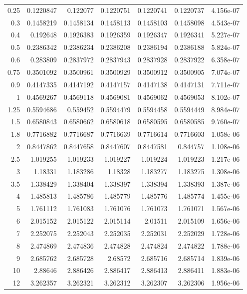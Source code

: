 \begin{longtable}{@{}rrrrrrr@{}}
0.25 & 0.1220847 & 0.122077 & 0.1220751 & 0.1220741 & 0.1220737 & 4.156e-07\\
0.3 & 0.1458219 & 0.1458134 & 0.1458113 & 0.1458103 & 0.1458098 & 4.543e-07\\
0.4 & 0.192648 & 0.1926383 & 0.1926359 & 0.1926347 & 0.1926341 & 5.227e-07\\
0.5 & 0.2386342 & 0.2386234 & 0.2386208 & 0.2386194 & 0.2386188 & 5.824e-07\\
0.6 & 0.283809 & 0.2837972 & 0.2837943 & 0.2837928 & 0.2837922 & 6.358e-07\\
0.75 & 0.3501092 & 0.3500961 & 0.3500929 & 0.3500912 & 0.3500905 & 7.074e-07\\
0.9 & 0.4147335 & 0.4147192 & 0.4147157 & 0.4147138 & 0.4147131 & 7.711e-07\\
1 & 0.4569267 & 0.4569118 & 0.4569081 & 0.4569062 & 0.4569053 & 8.102e-07\\
1.25 & 0.5594686 & 0.559452 & 0.5594479 & 0.5594458 & 0.5594449 & 8.984e-07\\
1.5 & 0.6580843 & 0.6580662 & 0.6580618 & 0.6580595 & 0.6580585 & 9.760e-07\\
1.8 & 0.7716882 & 0.7716687 & 0.7716639 & 0.7716614 & 0.7716603 & 1.058e-06\\
2 & 0.8447862 & 0.8447658 & 0.8447607 & 0.8447581 & 0.844757 & 1.108e-06\\
2.5 & 1.019255 & 1.019233 & 1.019227 & 1.019224 & 1.019223 & 1.217e-06\\
3 & 1.18331 & 1.183286 & 1.18328 & 1.183277 & 1.183275 & 1.308e-06\\
3.5 & 1.338429 & 1.338404 & 1.338397 & 1.338394 & 1.338393 & 1.387e-06\\
4 & 1.485813 & 1.485786 & 1.485779 & 1.485776 & 1.485774 & 1.455e-06\\
5 & 1.761112 & 1.761083 & 1.761076 & 1.761073 & 1.761071 & 1.567e-06\\
6 & 2.015152 & 2.015122 & 2.015114 & 2.01511 & 2.015109 & 1.656e-06\\
7 & 2.252075 & 2.252043 & 2.252035 & 2.252031 & 2.252029 & 1.728e-06\\
8 & 2.474869 & 2.474836 & 2.474828 & 2.474824 & 2.474822 & 1.788e-06\\
9 & 2.685762 & 2.685728 & 2.68572 & 2.685716 & 2.685714 & 1.839e-06\\
10 & 2.88646 & 2.886426 & 2.886417 & 2.886413 & 2.886411 & 1.883e-06\\
12 & 3.262357 & 3.262321 & 3.262312 & 3.262307 & 3.262306 & 1.956e-06\\

\end{longtable}
